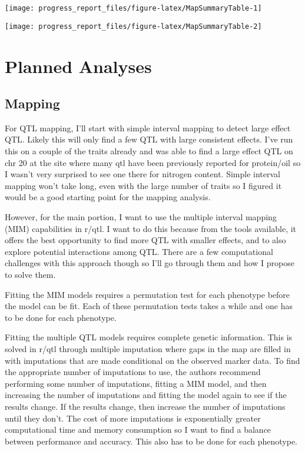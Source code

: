 \documentclass[
]{article}
\begin{document}
\begin{center}\texttt{[image: progress\_report\_files/figure-latex/MapSummaryTable-1]} \end{center}

\begin{center}\texttt{[image: progress\_report\_files/figure-latex/MapSummaryTable-2]} \end{center}

\hypertarget{planned-analyses}{%
\section{Planned Analyses}\label{planned-analyses}}

\hypertarget{mapping}{%
\subsection{Mapping}\label{mapping}}

For QTL mapping, I'll start with simple interval mapping to detect large
effect QTL. Likely this will only find a few QTL with large consistent
effects. I've run this on a couple of the traits already and was able to
find a large effect QTL on chr 20 at the site where many qtl have been
previously reported for protein/oil so I wasn't very surprised to see
one there for nitrogen content. Simple interval mapping won't take long,
even with the large number of traits so I figured it would be a good
starting point for the mapping analysis.

However, for the main portion, I want to use the multiple interval
mapping (MIM) capabilities in r/qtl. I want to do this because from the
tools available, it offers the best opportunity to find more QTL with
smaller effects, and to also explore potential interactions among QTL.
There are a few computational challenges with this approach though so
I'll go through them and how I propose to solve them.

Fitting the MIM models requires a permutation test for each phenotype
before the model can be fit. Each of these permutation tests takes a
while and one has to be done for each phenotype.

Fitting the multiple QTL models requires complete genetic information.
This is solved in r/qtl through multiple imputation where gaps in the
map are filled in with imputations that are made conditional on the
observed marker data. To find the appropriate number of imputations to
use, the authors recommend performing some number of imputations,
fitting a MIM model, and then increasing the number of imputations and
fitting the model again to see if the results change. If the results
change, then increase the number of imputations until they don't. The
cost of more imputations is exponentially greater computational time and
memory consumption so I want to find a balance between performance and
accuracy. This also has to be done for each phenotype.
\end{document}
